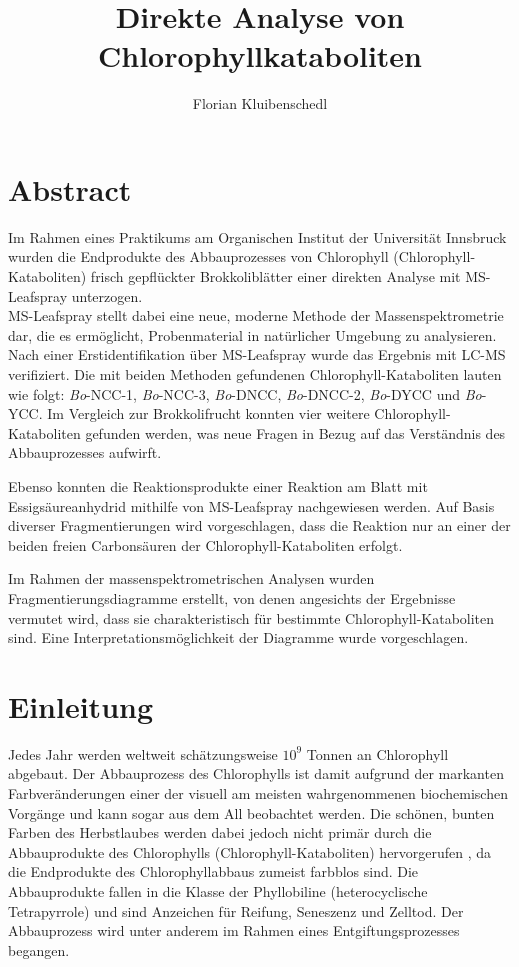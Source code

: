 \documentclass[12pt,a4paper]{article}
\author{Florian Kluibenschedl}
\title{Direkte Analyse von Chlorophyllkataboliten}
\begin{document}
\maketitle

\section{Abstract}
  Im Rahmen eines Praktikums am Organischen Institut der Universität Innsbruck wurden die Endprodukte des Abbauprozesses von Chlorophyll (Chlorophyll-Kataboliten) frisch gepflückter Brokkoliblätter einer direkten Analyse mit MS-Leafspray unterzogen.\\

MS-Leafspray stellt dabei eine neue, moderne Methode der Massenspektrometrie dar, die es ermöglicht, Probenmaterial in natürlicher Umgebung zu analysieren. Nach einer Erstidentifikation über MS-Leafspray wurde das Ergebnis mit LC-MS verifiziert. Die mit beiden Methoden gefundenen Chlorophyll-Kataboliten lauten wie folgt: \textit{Bo}-NCC-1, \textit{Bo}-NCC-3, \textit{Bo}-DNCC, \textit{Bo}-DNCC-2, \textit{Bo}-DYCC und \textit{Bo}-YCC. Im Vergleich zur Brokkolifrucht konnten vier weitere Chlorophyll-Kataboliten gefunden werden, was neue Fragen in Bezug auf das Verständnis des Abbauprozesses aufwirft. 

Ebenso konnten die Reaktionsprodukte einer Reaktion am Blatt mit Essigsäureanhydrid mithilfe von MS-Leafspray nachgewiesen werden. Auf Basis diverser Fragmentierungen wird vorgeschlagen, dass die Reaktion nur an einer der beiden freien Carbonsäuren der Chlorophyll-Kataboliten erfolgt. 

Im Rahmen der massenspektrometrischen Analysen wurden Fragmentierungsdiagramme erstellt, von denen angesichts der Ergebnisse vermutet wird, dass sie charakteristisch für bestimmte Chlorophyll-Kataboliten sind. Eine Interpretationsmöglichkeit der Diagramme wurde vorgeschlagen.

\section{Einleitung}

Jedes Jahr werden weltweit schätzungsweise $10^{9}$ Tonnen an Chlorophyll abgebaut. Der Abbauprozess des Chlorophylls ist damit aufgrund der markanten Farbveränderungen einer der visuell am meisten wahrgenommenen biochemischen Vorgänge und kann sogar aus dem All beobachtet werden. \cite{ChlorophyllBreakdown} Die schönen, bunten Farben des Herbstlaubes werden dabei jedoch nicht primär durch die Abbauprodukte des Chlorophylls (Chlorophyll-Kataboliten) hervorgerufen  \cite{DegradationChlorophyll}, da die Endprodukte des Chlorophyllabbaus zumeist farbblos sind. \cite{ChlorophyllBreakdown} Die Abbauprodukte fallen in die Klasse der Phyllobiline (heterocyclische Tetrapyrrole) und sind Anzeichen für Reifung, Seneszenz und Zelltod. Der Abbauprozess wird unter anderem im Rahmen eines Entgiftungsprozesses begangen. \cite{ChlorophyllKatabolitenalsZeichenReifung}
\end{document}
